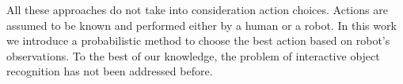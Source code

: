 
    All these approaches do not take into consideration action choices. Actions are assumed to be known and performed either by a human or a robot. In this work we introduce a probabilistic method to choose the best action based on robot's observations. To the best of our knowledge, the problem of interactive object recognition has not been addressed before. 
